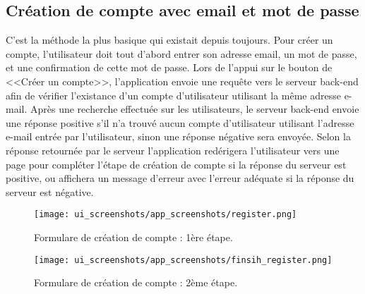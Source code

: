 \subsection{Création de compte avec email et mot de passe}
C'est la méthode la plus basique qui existait depuis toujours. Pour créer un compte, l'utilisateur doit tout d'abord entrer son adresse email, un mot de passe, et une confirmation de cette mot de passe. Lors de l'appui sur le bouton de <<Créer un compte>>, l'application envoie une requête vers le serveur back-end afin de vérifier l'existance d'un compte d'utilisateur utilisant la même adresse e-mail. Après une recherche effectuée sur les utilisateurs, le serveur back-end envoie une réponse positive s'il n'a trouvé aucun compte d'utilisateur utilisant l'adresse e-mail entrée par l'utilisateur, sinon une réponse négative sera envoyée. Selon la réponse retournée par le serveur l'application redérigera l'utilisateur vers une page pour compléter l'étape de création de compte si la réponse du serveur est positive, ou affichera un message d'erreur avec l'erreur adéquate si la réponse du serveur est négative.
\newpage
\begin{multicols}{2}
    \begin{figure}[H]
        \begin{center}
            \centering
            \texttt{[image: ui\_screenshots/app\_screenshots/register.png]}
            \captionsetup{justification=centering}
            \caption{Formulare de création de compte : 1ère étape.}
            \label{fig:app_register}
        \end{center}
    \end{figure}
    \begin{figure}[H]
        \begin{center}
            \centering
            \texttt{[image: ui\_screenshots/app\_screenshots/finsih\_register.png]}
            \captionsetup{justification=centering}
            \caption{Formulare de création de compte : 2ème étape.}
            \label{fig:app_finish_register}
        \end{center}
    \end{figure}
\end{multicols}
